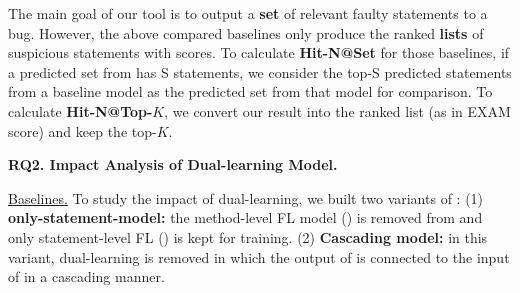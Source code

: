 

The main goal of our tool is to output a {\bf set} of relevant faulty
statements to a bug. However, the above compared baselines only
produce the ranked {\bf lists} of suspicious statements with scores.
%
To calculate \textbf{Hit-N@Set} for those baselines, if a predicted
set from {\tool} has S statements, we consider the top-S predicted
statements from a baseline model as the predicted set from that model
for comparison.
%
To calculate {\bf Hit-N@Top-$K$}, we convert our result into
the ranked list (as in EXAM score) and keep the top-$K$.





{\bf RQ2. Impact Analysis of Dual-learning Model.}

\underline{Baselines.} To study the impact of dual-learning, we built two variants of {\tool}: 
(1) \textbf{only-statement-model:} the method-level FL model
() is removed from {\tool} and only statement-level FL
() is kept for training. (2) \textbf{Cascading model:} in
this variant, dual-learning is removed in which the output
of  is connected to the input of  in a
cascading manner.


